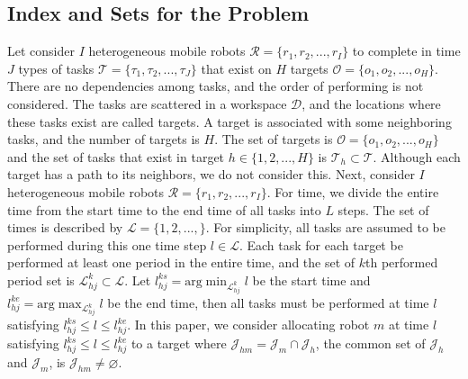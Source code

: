 \documentclass[]{interact}
\theoremstyle{plain}%
\theoremstyle{definition}
\theoremstyle{remark}
\begin{document}
\subsection{Index and Sets for the Problem}
Let consider $I$ heterogeneous mobile robots $\mathcal{R}=\{r_1,r_2,...,r_I\}$ to complete in time $J$ types of tasks $\mathcal{T}=\{\tau_1,\tau_2,...,\tau_J\}$ that exist on $H$ targets $\mathcal{O}=\{o_1,o_2,...,o_H\}$.
There are no dependencies among tasks, and the order of performing is not considered. 
The tasks are scattered in a workspace $\mathcal{D}$, and the locations where these tasks exist are called targets. 
A target is associated with some neighboring tasks, and the number of targets is $H$. 
The set of targets is $\mathcal{O} = \{o_1,o_2,...,o_H\}$ and the set of tasks that exist in target $h\in\{1,2,...,H\}$ is $\mathcal{T}_h\subset \mathcal{T}$. 
Although each target has a path to its neighbors, we do not consider this.
Next, consider $I$ heterogeneous mobile robots $\mathcal{R}=\{r_1,r_2,...,r_I\}$.
For time, we divide the entire time from the start time to the end time of all tasks into $L$ steps. 
The set of times is described by $\mathcal{L}=\{1,2,...,\}$.
For simplicity, all tasks are assumed to be performed during this one time step $l\in\mathcal{L}$.
Each task for each target be performed at least one period in the entire time, and the set of $k$th performed period set is $\mathcal{L}^k_{hj}\subset\mathcal{L}$. 
Let $l^{ks}_{hj} = \mathrm{arg}\min_{\mathcal{L}^k_{hj}} l$ be the start time and $l^{ke}_{hj} = \mathrm{arg}\max_{\mathcal{L}^k_{hj}} l$ be the end time, then all tasks must be performed at time $l$ satisfying $l^{ks}_{hj} \le l \le l^{ke}_{hj}$.
In this paper, we consider allocating robot $m$ at time $l$ satisfying $l^{ks}_{hj} \le l \le l^{ke}_{hj}$ to a target where $\mathcal{J}_{hm}=\mathcal{J}_{m}\cap\mathcal{J}_{h}$, the common set of $\mathcal{J}_h$ and $\mathcal{J}_m$, is $\mathcal{J}_{hm}\neq \varnothing$.
\end{document}
